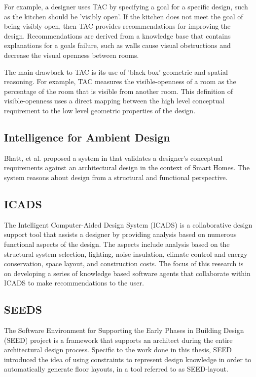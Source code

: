 \documentclass[12pt]{ucthesis}
\begin{document}
For example, a designer uses TAC by specifying a goal for a specific design, such as the kitchen should be 'visibly open'. If the kitchen does not meet the goal of being visibly open, then TAC provides recommendations for improving the design. Recommendations are derived from a knowledge base that contains explanations for a goals failure, such as walls cause visual obstructions and decrease the visual openness between rooms. 

The main drawback to TAC is its use of 'black box' geometric and spatial reasoning. For example, TAC measures the visible-openness of a room as the percentage of the room that is visible from another room. This definition of visible-openness uses a direct mapping between the high level conceptual requirement to the low level geometric properties of the design. 


\subsection{Intelligence for Ambient Design}
Bhatt, et al. proposed a system in \cite{BhattDH09} that validates a designer's conceptual requirements against an architectural design in the context of Smart Homes. The system reasons about design from a structural and functional perspective.   

\subsection{ICADS}
The Intelligent Computer-Aided Design System (ICADS) \cite{ICADS} is a collaborative design support tool that assists a designer by providing analysis based on numerous functional aspects of the design. The aspects include analysis based on the structural system selection, lighting, noise insulation, climate control and energy conservation, space layout, and construction costs. The focus of this research is on developing a series of knowledge based software agents that collaborate within ICADS to make recommendations to the user. 

\subsection{SEEDS}
The Software Environment for Supporting the Early Phases in Building Design (SEED) project \cite{SEEDS} is a framework that supports an architect during the entire architectural design process. Specific to the work done in this thesis, SEED introduced the idea of using constraints to represent design knowledge in order to automatically generate floor layouts, in a tool referred to as SEED-layout. 
\end{document}
